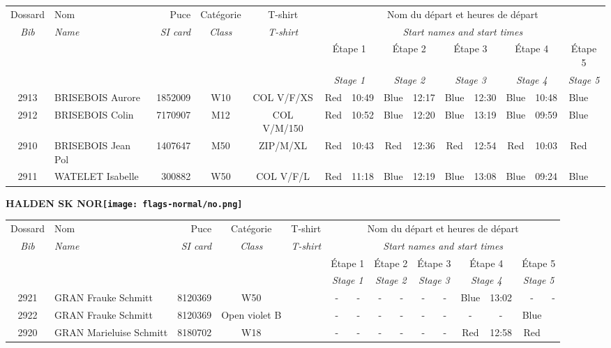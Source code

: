 \documentclass{report}
\begin{document}
  \begin{longtable}{|c|l|r|c|c|*{5}{cc|}}
    Dossard & Nom  & Puce    & Catégorie & T-shirt & \multicolumn{10}{c|}{Nom du départ et heures de départ} \\
    \itshape Bib     & \itshape Name & \itshape SI card & \itshape Class  & \itshape  T-shirt  & \multicolumn{10}{c|}{\itshape Start names and start times} \\
    \hline
    & & & & & \multicolumn{2}{c|}{Étape 1} & \multicolumn{2}{c|}{Étape 2} & \multicolumn{2}{c|}{Étape 3} & \multicolumn{2}{c|}{Étape 4} & \multicolumn{2}{c|}{Étape 5} \\
    & & & & & \multicolumn{2}{c|}{\itshape Stage 1} & \multicolumn{2}{c|}{\itshape Stage 2} & \multicolumn{2}{c|}{\itshape Stage 3} & \multicolumn{2}{c|}{\itshape Stage 4} & \multicolumn{2}{c|}{\itshape Stage 5} \\
    \hline
    2913 & BRISEBOIS Aurore & 1852009 & W10 & COL V/F/XS & Red & 10:49 & Blue & 12:17 & Blue & 12:30 & Blue & 10:48 & Blue &  \\
    2912 & BRISEBOIS Colin & 7170907 & M12 & COL V/M/150 & Red & 10:52 & Blue & 12:20 & Blue & 13:19 & Blue & 09:59 & Blue &  \\
    2910 & BRISEBOIS Jean Pol & 1407647 & M50 & ZIP/M/XL & Red & 10:43 & Red & 12:36 & Red & 12:54 & Red & 10:03 & Red &  \\
    2911 & WATELET Isabelle & 300882 & W50 & COL V/F/L & Red & 11:18 & Blue & 12:19 & Blue & 13:08 & Blue & 09:24 & Blue &  \\
  \end{longtable}
\newpage
  \Huge \centering \bfseries HALDEN SK  NOR\normalfont \footnotesize \sffamily \hfill \texttt{[image: flags-normal/no.png]} \newline 
  \begin{longtable}{|c|l|r|c|c|*{5}{cc|}}
    Dossard & Nom  & Puce    & Catégorie & T-shirt & \multicolumn{10}{c|}{Nom du départ et heures de départ} \\
    \itshape Bib     & \itshape Name & \itshape SI card & \itshape Class  & \itshape  T-shirt  & \multicolumn{10}{c|}{\itshape Start names and start times} \\
    \hline
    & & & & & \multicolumn{2}{c|}{Étape 1} & \multicolumn{2}{c|}{Étape 2} & \multicolumn{2}{c|}{Étape 3} & \multicolumn{2}{c|}{Étape 4} & \multicolumn{2}{c|}{Étape 5} \\
    & & & & & \multicolumn{2}{c|}{\itshape Stage 1} & \multicolumn{2}{c|}{\itshape Stage 2} & \multicolumn{2}{c|}{\itshape Stage 3} & \multicolumn{2}{c|}{\itshape Stage 4} & \multicolumn{2}{c|}{\itshape Stage 5} \\
    \hline
    2921 & GRAN Frauke Schmitt & 8120369 & W50 &   & - &  - & - &  - & - &  - & Blue & 13:02 & - &  -\\
    2922 & GRAN Frauke Schmitt & 8120369 & Open violet B &   & - &  - & - &  - & - &  - & - &  - & Blue &  \\
    2920 & GRAN Marieluise Schmitt & 8180702 & W18 &   & - &  - & - &  - & - &  - & Red & 12:58 & Red &  \\
  \end{longtable}
\end{document}
